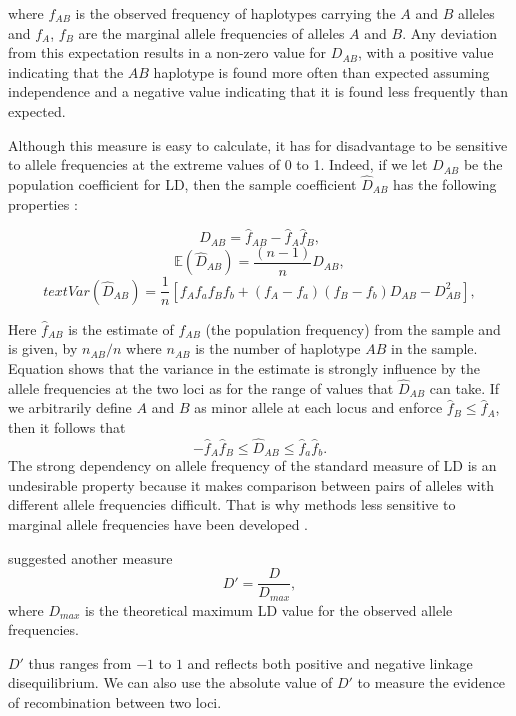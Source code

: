 \documentclass[]{book}
\begin{document}
where \(f_{AB}\) is the observed frequency of haplotypes carrying the \(A\)
and \(B\) alleles and \(f_{A}\), \(f_{B}\) are the marginal allele frequencies
of alleles \(A\) and \(B\). Any deviation from this expectation results in a
non-zero value for \(D_{AB}\), with a positive value indicating that the
\(AB\) haplotype is found more often than expected assuming independence
and a negative value indicating that it is found less frequently than
expected.

Although this measure is easy to calculate, it has for disadvantage to
be sensitive to allele frequencies at the extreme values of 0 to 1.
Indeed, if we let \(D_{AB}\) be the population coefficient for LD, then
the sample coefficient \(\hat{D}_{AB}\) has the following properties
\citep{hill_1974_estimation}:

\[ D_{AB} = \hat{f}_{AB} - \hat{f}_{A} \hat{f}_{B},\]
\[ \mathbb{E}(\hat{D}_{AB}) = \dfrac{(n-1)}{n} D_{AB}, \]
\begin{equation}
text{Var}(\hat{D}_{AB})= \dfrac{1}{n}[f_A f_a f_B f_b + (f_A - f_a)(f_B - f_b)D_{AB} - D^2_{AB}],
\label{eq:2}
\end{equation}

Here \(\hat{f}_{AB}\) is the estimate of \(f_{AB}\) (the population
frequency) from the sample and is given, by \(n_{AB}/n\) where \(n_{AB}\) is
the number of haplotype \(AB\) in the sample. Equation shows that the
variance in the estimate is strongly influence by the allele frequencies
at the two loci as for the range of values that \(\hat{D}_{AB}\) can take.
If we arbitrarily define \(A\) and \(B\) as minor allele at each locus and
enforce \(\hat{f}_B \leq \hat{f}_A\), then it follows that
\[-\hat{f}_A\hat{f}_B \leq \hat{D}_{AB} \leq \hat{f}_a\hat{f}_b. \nonumber\]
The strong dependency on allele frequency of the standard measure of LD
is an undesirable property because it makes comparison between pairs of
alleles with different allele frequencies difficult. That is why methods
less sensitive to marginal allele frequencies have been developed
\citep{hedrick_1987_gametic}.

\citep{Lewontin_1964_interaction} suggested another measure
\[D'= \frac{D}{D_{max}}, \nonumber\] where \(D_{max}\) is the theoretical
maximum LD value for the observed allele frequencies.

\(D'\) thus ranges from \(−1\) to \(1\) and reflects both positive and
negative linkage disequilibrium. We can also use the absolute value of
\(D'\) to measure the evidence of recombination between two loci.
\end{document}
